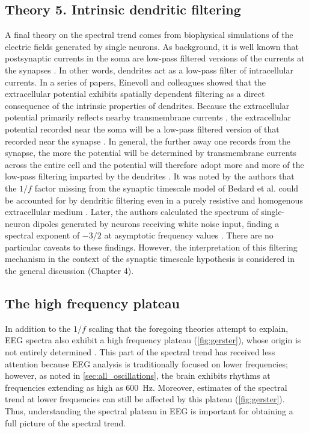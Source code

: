 \subsection{Theory 5. Intrinsic dendritic filtering}
A final theory on the spectral trend comes from biophysical simulations of the electric fields generated by single neurons. As background, it is well known that postsynaptic currents in the soma are low-pass filtered versions of the currents at the synapses \cite{Rall1967}. In other words, dendrites act as a low-pass filter of intracellular currents. In a series of papers, Einevoll and colleagues showed that the extracellular potential exhibits spatially dependent filtering as a direct consequence of the intrinsic properties of dendrites. Because the extracellular potential primarily reflects nearby transmembrane currents \cite{Nunez2006}, the extracellular potential recorded near the soma will be a low-pass filtered version of that recorded near the synapse \cite{Linden2010}. In general, the further away one records from the synapse, the more the potential will be determined by transmembrane currents across the entire cell and the potential will therefore adopt more and more of the low-pass filtering imparted by the dendrites \cite{Linden2010}. It was noted by the authors that the $1/f$ factor missing from the synaptic timescale model of Bedard et al. \cite{Bedard2006} could be accounted for by dendritic filtering even in a purely resistive and homogenous extracellular medium \cite{Linden2010,Pettersen2008}. Later, the authors calculated the spectrum of single-neuron dipoles generated by neurons receiving white noise input, finding a spectral exponent of $-3/2$ at asymptotic frequency values \cite{Pettersen2014}. There are no particular caveats to these findings. However, the interpretation of this filtering mechanism in the context of the synaptic timescale hypothesis is considered in the general discussion (Chapter 4). 

\subsection{The high frequency plateau}
In addition to the $1/f$ scaling that the foregoing theories attempt to explain, EEG spectra also exhibit a high frequency plateau (\autoref{fig:gerster}), whose origin is not entirely determined \cite{Gerster2022}. This part of the spectral trend has received less attention because EEG analysis is traditionally focused on lower frequencies; however, as noted in \autoref{sec:all_oscillations}, the brain exhibits rhythms at frequencies extending as high as \qty{600}{\hertz}. Moreover, estimates of the spectral trend at lower frequencies can still be affected by this plateau (\autoref{fig:gerster}). Thus, understanding the spectral plateau in EEG is important for obtaining a full picture of the spectral trend. 

